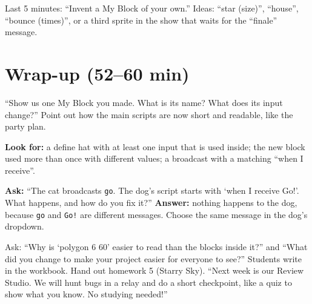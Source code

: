 \begin{freebuild}
Last 5 minutes: \enquote{Invent a My Block of your own.} Ideas: \enquote{star (size)}, \enquote{house}, \enquote{bounce (times)}, or a third sprite in the show that waits for the \enquote{finale} message.
\end{freebuild}

\section{Wrap-up (52--60 min)}
\begin{teacherscript}
\enquote{Show us one My Block you made. What is its name? What does its input change?} Point out how the main scripts are now short and readable, like the party plan.
\end{teacherscript}

\begin{formativecheck}
\textbf{Look for:} a define hat with at least one input that is used inside; the new block used more than once with different values; a broadcast with a matching \enquote{when I receive}.

\textbf{Ask:} \enquote{The cat broadcasts \texttt{go}. The dog's script starts with \enquote{when I receive Go!}. What happens, and how do you fix it?}
\textbf{Answer:} nothing happens to the dog, because \texttt{go} and \texttt{Go!} are different messages. Choose the same message in the dog's dropdown.
\end{formativecheck}

\begin{reflection}
Ask: \enquote{Why is \enquote{polygon 6 60} easier to read than the blocks inside it?} and \enquote{What did you change to make your project easier for everyone to see?} Students write in the workbook. Hand out homework 5 (Starry Sky). \enquote{Next week is our Review Studio. We will hunt bugs in a relay and do a short checkpoint, like a quiz to show what you know. No studying needed!}
\end{reflection}

